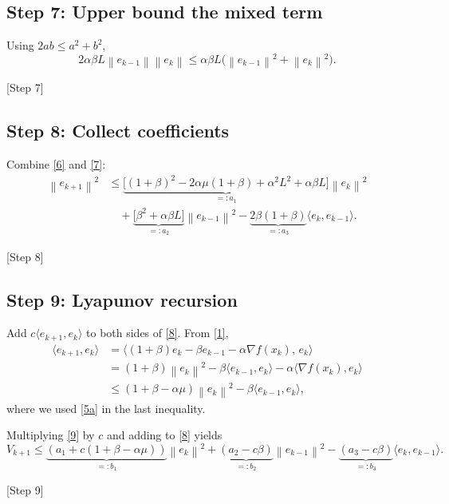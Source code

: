 \documentclass{article}
\newcommand{\norm}[1]{\left\|#1\right\|}
\begin{document}
\subsection*{Step 7: Upper bound the mixed term}
Using $2ab\le a^{2}+b^{2}$,
\[
2\alpha\beta L \norm{e_{k-1}}\norm{e_k}
\le \alpha\beta L\bigl(\norm{e_{k-1}}^{2}+\norm{e_k}^{2}\bigr).
\tag{7}
\]
\begin{center}
[Step 7]
\end{center}

\subsection*{Step 8: Collect coefficients}
Combine \eqref{6} and \eqref{7}:
\[
\begin{aligned}
\norm{e_{k+1}}^{2}
&\le \underbrace{\bigl[(1+\beta)^{2}-2\alpha\mu(1+\beta)+\alpha^{2}L^{2}
        +\alpha\beta L\bigr]}_{=:a_1}\norm{e_k}^{2}\\
&\quad +\underbrace{\bigl[\beta^{2}+\alpha\beta L\bigr]}_{=:a_2}\norm{e_{k-1}}^{2}
   -\underbrace{2\beta(1+\beta)}_{=:a_3}\langle e_k,e_{k-1}\rangle .
\end{aligned}
\tag{8}
\]
\begin{center}
[Step 8]
\end{center}

\subsection*{Step 9: Lyapunov recursion}
Add $c\langle e_{k+1},e_k\rangle$ to both sides of \eqref{8}.  From \eqref{1},
\[
\begin{aligned}
\langle e_{k+1},e_k\rangle
&=\langle (1+\beta)e_k-\beta e_{k-1}-\alpha\nabla f(x_k),\,e_k\rangle\\
&=(1+\beta)\norm{e_k}^{2}-\beta\langle e_{k-1},e_k\rangle
   -\alpha\langle\nabla f(x_k),e_k\rangle\\
&\le (1+\beta-\alpha\mu)\norm{e_k}^{2}
   -\beta\langle e_{k-1},e_k\rangle,
\end{aligned}
\tag{9}
\]
where we used \eqref{5a} in the last inequality.

Multiplying \eqref{9} by $c$ and adding to \eqref{8} yields
\[
V_{k+1}\le \underbrace{(a_1+c(1+\beta-\alpha\mu))}_{=:b_1}\norm{e_k}^{2}
          +\underbrace{(a_2-c\beta)}_{=:b_2}\norm{e_{k-1}}^{2}
          -\underbrace{(a_3-c\beta)}_{=:b_3}\langle e_k,e_{k-1}\rangle .
\tag{10}
\]
\begin{center}
[Step 9]
\end{center}
\end{document}
